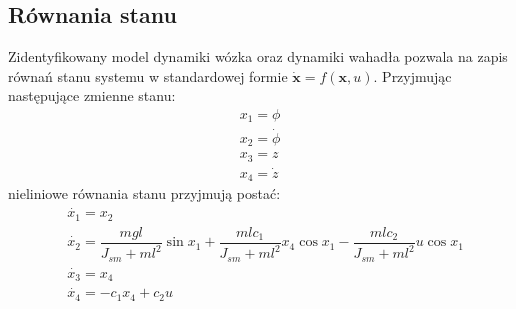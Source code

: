 \subsection{Równania stanu}
Zidentyfikowany model dynamiki wózka oraz dynamiki wahadła pozwala na zapis równań stanu systemu w standardowej formie $\dot{\textbf{x}}=f(\textbf{x},u)$. Przyjmując następujące zmienne stanu:
\begin{equation}
\label{eq:rStan1}
\begin{aligned}
x_{1} = \phi \\
x_{2} = \dot{\phi} \\
x_{3} = z\\
x_{4} = \dot{z}
\end{aligned}
\end{equation}
nieliniowe równania stanu przyjmują postać:
\begin{equation}
\label{eq:rStan2}
\begin{aligned}
&\dot{x_{1}} = x_2 \\
&\dot{x_{2}} = \dfrac{mgl}{J_{sm}+ml^2}\sin x_1+\dfrac{mlc_1}{J_{sm}+ml^2}x_4\cos x_1-\dfrac{mlc_2}{J_{sm}+ml^2}u\cos x_1 \\
&\dot{x_{3}} = x_4\\
&\dot{x_{4}} = -c_1x_4+c_2u
\end{aligned}
\end{equation}
